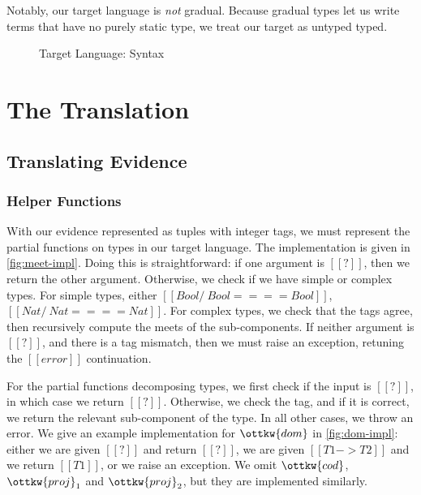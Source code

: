 \documentclass[11pt]{article}
\begin{document}
 Notably, our target language is \textit{not} gradual. Because gradual types let us write terms that have no purely static type,
 we treat our target as untyped typed. 

\begin{figure}[H]
	\caption{Target Language: Syntax}
	\label{fig:target-syntax}
\end{figure}

\section{The Translation} 

\subsection{Translating Evidence}

\subsubsection{Helper Functions}

With our evidence represented as tuples with integer tags, we must represent the partial functions
on types in our target language.
The implementation is given in \autoref{fig:meet-impl}.
Doing this is straightforward: if one argument is $[[?]]$,
then we return the other argument. Otherwise, we check if we have simple or complex types.
For simple types, either $[[Bool /\ Bool ==== Bool]]$, $[[Nat /\ Nat ==== Nat]]$.
For complex types, we check that the tags agree, then recursively compute the meets of the sub-components.
If neither argument is $[[?]]$, and there is a tag mismatch, then we must raise an exception, retuning the $[[error]]$
continuation.

For the partial functions decomposing types, we first check if the input is $[[?]]$,
in which case we return $[[?]]$. Otherwise, we check the tag, and if it is correct, we return
the relevant sub-component of the type. In all other cases, we throw an error.
We give an example implementation for $\ottkw{dom}$ in \autoref{fig:dom-impl}: either we are given $[[?]]$
and return $[[?]]$, we are given $[[T1 -> T2]]$ and we return $[[T1]]$, or we raise an exception.
We omit $\ottkw{cod}$, $\ottkw{proj}_1$ and $\ottkw{proj}_2$, but they are implemented similarly.
\end{document}
